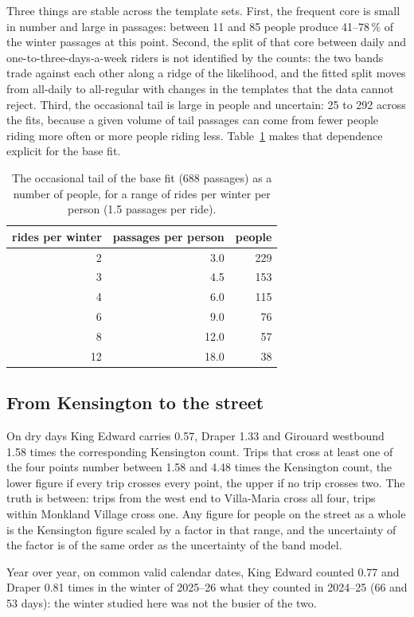 \documentclass[11pt,a4paper]{article}
\begin{document}
Three things are stable across the template sets. First, the frequent core is small in number and large in passages: between 11 and 85 people produce 41--78\,\% of the winter passages at this point. Second, the split of that core between daily and one-to-three-days-a-week riders is not identified by the counts: the two bands trade against each other along a ridge of the likelihood, and the fitted split moves from all-daily to all-regular with changes in the templates that the data cannot reject. Third, the occasional tail is large in people and uncertain: 25 to 292 across the fits, because a given volume of tail passages can come from fewer people riding more often or more people riding less. Table~\ref{tab:tail} makes that dependence explicit for the base fit.
\begin{table}[htbp]\centering\small\caption{The occasional tail of the base fit (688 passages) as a number of people, for a range of rides per winter per person (1.5 passages per ride).}\label{tab:tail}
\begin{tabular}{@{}rrr@{}}\toprule rides per winter & passages per person & people\\ \midrule
2 & 3.0 & 229 \\
3 & 4.5 & 153 \\
4 & 6.0 & 115 \\
6 & 9.0 & 76 \\
8 & 12.0 & 57 \\
12 & 18.0 & 38 \\
\bottomrule\end{tabular}\end{table}

\subsection{From Kensington to the street}
On dry days King Edward carries 0.57, Draper 1.33 and Girouard westbound 1.58 times the corresponding Kensington count. Trips that cross at least one of the four points number between 1.58 and 4.48 times the Kensington count, the lower figure if every trip crosses every point, the upper if no trip crosses two. The truth is between: trips from the west end to Villa-Maria cross all four, trips within Monkland Village cross one. Any figure for people on the street as a whole is the Kensington figure scaled by a factor in that range, and the uncertainty of the factor is of the same order as the uncertainty of the band model.

Year over year, on common valid calendar dates, King Edward counted 0.77 and Draper 0.81 times in the winter of 2025--26 what they counted in 2024--25 (66 and 53 days): the winter studied here was not the busier of the two.
\end{document}

